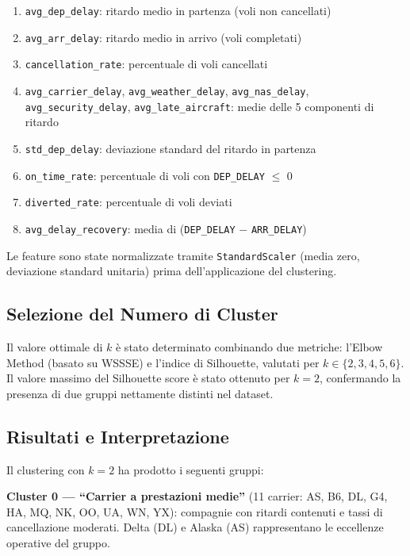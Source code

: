 \documentclass[sigconf]{acmart}
\begin{document}
\begin{enumerate}
  \item \texttt{avg\_dep\_delay}: ritardo medio in partenza (voli non cancellati)
  \item \texttt{avg\_arr\_delay}: ritardo medio in arrivo (voli completati)
  \item \texttt{cancellation\_rate}: percentuale di voli cancellati
  \item \texttt{avg\_carrier\_delay}, \texttt{avg\_weather\_delay},
        \texttt{avg\_nas\_delay}, \texttt{avg\_security\_delay},
        \texttt{avg\_late\_aircraft}: medie delle 5 componenti di ritardo
  \item \texttt{std\_dep\_delay}: deviazione standard del ritardo in partenza
  \item \texttt{on\_time\_rate}: percentuale di voli con \texttt{DEP\_DELAY} $\leq$ 0
  \item \texttt{diverted\_rate}: percentuale di voli deviati
  \item \texttt{avg\_delay\_recovery}: media di (\texttt{DEP\_DELAY} $-$ \texttt{ARR\_DELAY})
\end{enumerate}

Le feature sono state normalizzate tramite \texttt{StandardScaler} (media zero,
deviazione standard unitaria) prima dell'applicazione del clustering.

\subsection{Selezione del Numero di Cluster}

Il valore ottimale di $k$ è stato determinato combinando due metriche:
l'Elbow Method (basato su WSSSE) e l'indice di Silhouette, valutati per
$k \in \{2, 3, 4, 5, 6\}$. Il valore massimo del Silhouette score è stato
ottenuto per $k = 2$, confermando la presenza di due gruppi nettamente
distinti nel dataset.

\subsection{Risultati e Interpretazione}

Il clustering con $k = 2$ ha prodotto i seguenti gruppi:

\textbf{Cluster 0 — ``Carrier a prestazioni medie''} (11 carrier: AS, B6, DL,
G4, HA, MQ, NK, OO, UA, WN, YX): compagnie con ritardi contenuti e tassi di
cancellazione moderati. Delta (DL) e Alaska (AS) rappresentano le eccellenze
operative del gruppo.
\end{document}
